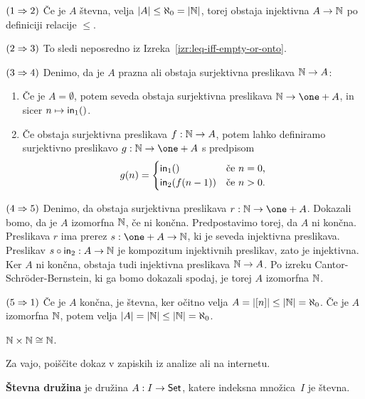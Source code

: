 \begin{dokaz}
$(1 \Rightarrow 2)$
%
Če je $A$ števna, velja $|A| \leq \aleph_0 = |\mathbb{N}|$, torej obstaja injektivna $A \to
\mathbb{N}$ po definiciji relacije $\leq$.

$(2 \Rightarrow 3)$
%
To sledi neposredno iz Izreka~\ref{izr:leq-iff-empty-or-onto}.

$(3 \Rightarrow 4)$
%
Denimo, da je $A$ prazna ali obstaja surjektivna preslikava $\mathbb{N} \to A$:
%
\begin{enumerate}
\item
  Če je $A = \emptyset$, potem seveda obstaja surjektivna preslikava $\NN \to \one + A$, in sicer
  $n \mapsto \mathsf{in}_{1} ()$.
\item 
  Če obstaja surjektivna preslikava $f : \mathbb{N} \to A$, potem lahko definiramo surjektivno
  preslikavo $g : \NN \to \one + A$ s predpisom
  \begin{equation*}
    g(n) =
    \begin{cases}
      \mathsf{in}_{1} ()      &\text{če $n = 0$,}\\
      \mathsf{in}_{2} (f(n-1))   &\text{če $n > 0$.}
    \end{cases}
  \end{equation*}
\end{enumerate}

$(4 \Rightarrow 5)$
%
Denimo, da obstaja surjektivna preslikava $r : \NN \to \one + A$.
Dokazali bomo, da je $A$ izomorfna $\mathbb{N}$, če ni končna.
Predpostavimo torej, da $A$ ni končna.
Preslikava $r$ ima prerez $s : \one + A \to \NN$, ki je seveda injektivna preslikava.
Preslikav $s \circ \mathsf{in}_{2} : A \to \mathbb{N}$ je kompozitum injektivnih preslikav, zato je injektivna.
Ker $A$ ni končna, obstaja tudi injektivna preslikava $\mathbb{N} \to A$.
Po izreku Cantor-Schröder-Bernstein, ki ga bomo dokazali spodaj, je torej $A$ izomorfna $\mathbb{N}$.

$(5 \Rightarrow 1)$
%
Če je $A$ končna, je števna, ker očitno velja $A = |[n]| \leq |\mathbb{N}| = \aleph_0$.
Če je $A$ izomorfna $\mathbb{N}$, potem velja $|A| = |\mathbb{N}| \leq |\mathbb{N}| = \aleph_0$.
\end{dokaz}

\begin{izrek}
  $\mathbb{N} \times \mathbb{N} \cong \mathbb{N}$.
\end{izrek}

\begin{dokaz}
  Za vajo, poiščite dokaz v zapiskih iz analize ali na internetu.
\end{dokaz}

\textbf{Števna družina} je družina $A : I \to \mathsf{Set}$, katere indeksna množica~$I$ je števna.

